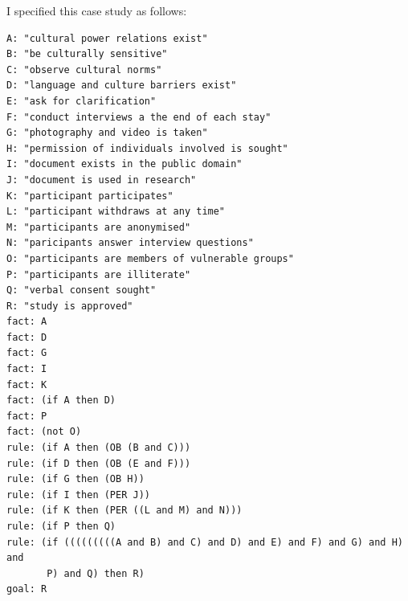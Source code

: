 \documentclass{l4proj}
\begin{document}
I specified this case study as follows: 
\begin{verbatim}
A: "cultural power relations exist"
B: "be culturally sensitive"
C: "observe cultural norms"
D: "language and culture barriers exist"
E: "ask for clarification"
F: "conduct interviews a the end of each stay"
G: "photography and video is taken"
H: "permission of individuals involved is sought"
I: "document exists in the public domain"
J: "document is used in research"
K: "participant participates"
L: "participant withdraws at any time"
M: "participants are anonymised"
N: "paricipants answer interview questions"
O: "participants are members of vulnerable groups"
P: "participants are illiterate"
Q: "verbal consent sought"
R: "study is approved"
fact: A
fact: D
fact: G
fact: I
fact: K
fact: (if A then D)
fact: P
fact: (not O)
rule: (if A then (OB (B and C)))
rule: (if D then (OB (E and F)))
rule: (if G then (OB H))
rule: (if I then (PER J))
rule: (if K then (PER ((L and M) and N)))
rule: (if P then Q)
rule: (if (((((((((A and B) and C) and D) and E) and F) and G) and H) and 
       P) and Q) then R)
goal: R
\end{verbatim}
\end{document}
